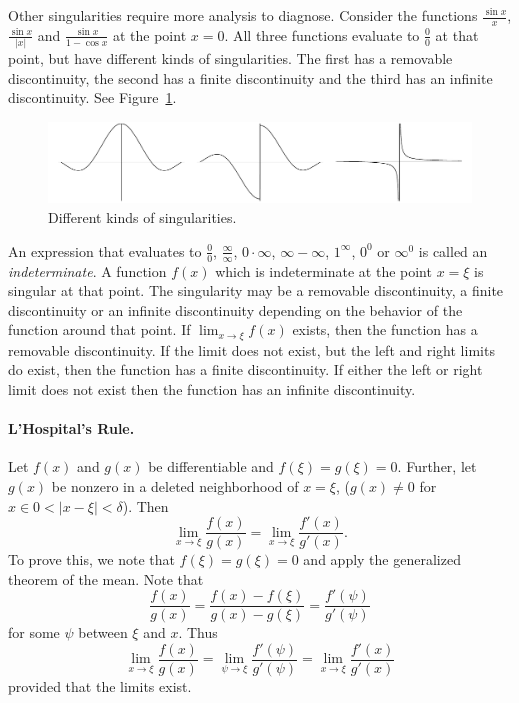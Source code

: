 Other singularities require more analysis to diagnose.  Consider the 
functions $\frac{\sin x}{x}$, $\frac{\sin x}{|x|}$ and 
$\frac{\sin x}{1 - \cos x}$ at the point $x = 0$.  All three functions
evaluate to $\frac{0}{0}$ at that point, but have different kinds
of singularities.  The first has a removable discontinuity, the second has
a finite discontinuity and the third has an infinite discontinuity.
See Figure~\ref{disc3}.

\begin{figure}[h!]
  \begin{center}
    \includegraphics[width=\textwidth]{calculus/differential/disc3}
  \end{center}
  \caption{Different kinds of singularities.}
  \label{disc3}
\end{figure}



An expression that evaluates to $\frac{0}{0}$, $\frac{\infty}{\infty}$,
$0 \cdot \infty$, $\infty - \infty$, $1^\infty$, $0^0$ or $\infty^0$
is called an \textit{indeterminate}.  A function $f(x)$ which is indeterminate
at the point $x = \xi$ is singular at that point.  The singularity may be a 
removable discontinuity, a finite discontinuity or an infinite discontinuity
depending on the behavior of the function around that point.  If
$\lim_{x \to \xi} f(x)$ exists, then the function has a removable 
discontinuity.  If the limit does not exist, but the left and right limits 
do exist, then the function has a finite discontinuity.  If either the
left or right limit does not exist then the function has an infinite
discontinuity.





\paragraph{L'Hospital's Rule.}
Let $f(x)$ and $g(x)$ be differentiable and $f(\xi) = g(\xi) = 0$.  
Further, let $g(x)$ be nonzero in a deleted neighborhood of $x= \xi$, 
($g(x) \neq 0$ for $x \in 0 < |x - \xi| < \delta$).  Then
\[
\lim_{x \to \xi} \frac{f(x)}{g(x)} = \lim_{x \to \xi} \frac{f'(x)}{g'(x)}.
\]
To prove this, we note that $f(\xi) = g(\xi) = 0$ and apply the generalized
theorem of the mean.  Note that
\[
\frac{f(x)}{g(x)} = \frac{f(x) - f(\xi)}{g(x) - g(\xi)}
= \frac{f'(\psi)}{g'(\psi)}
\]
for some $\psi$ between $\xi$ and $x$.  Thus
\[
\lim_{x \to \xi} \frac{f(x)}{g(x)} 
= \lim_{\psi \to \xi} \frac{f'(\psi)}{g'(\psi)}
= \lim_{x \to \xi} \frac{f'(x)}{g'(x)}
\]
provided that the limits exist.


